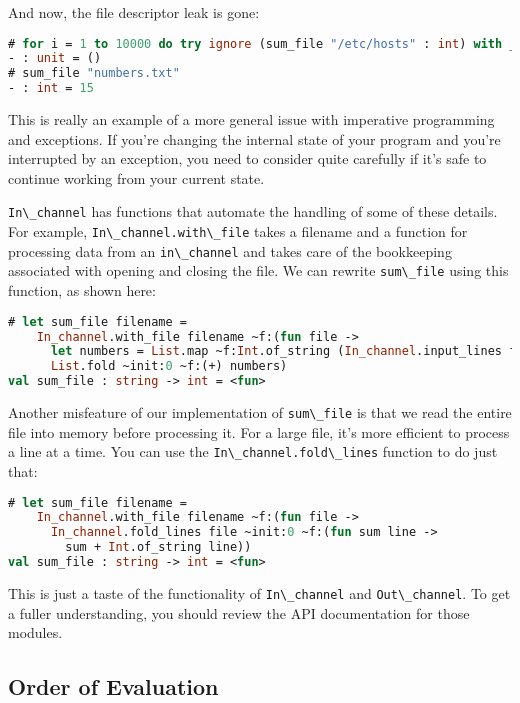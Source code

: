 And now, the file descriptor leak is gone:

\begin{lstlisting}[language=Caml]
# for i = 1 to 10000 do try ignore (sum_file "/etc/hosts" : int) with _ -> () done
- : unit = ()
# sum_file "numbers.txt"
- : int = 15
\end{lstlisting}

This is really an example of a more general issue with imperative
programming and exceptions. If you're changing the internal state of
your program and you're interrupted by an exception, you need to
consider quite carefully if it's safe to continue working from your
current state.

\passthrough{\lstinline!In\_channel!} has functions that automate the
handling of some of these details. For example,
\passthrough{\lstinline!In\_channel.with\_file!} takes a filename and a
function for processing data from an
\passthrough{\lstinline!in\_channel!} and takes care of the bookkeeping
associated with opening and closing the file. We can rewrite
\passthrough{\lstinline!sum\_file!} using this function, as shown here:

\begin{lstlisting}[language=Caml]
# let sum_file filename =
    In_channel.with_file filename ~f:(fun file ->
      let numbers = List.map ~f:Int.of_string (In_channel.input_lines file) in
      List.fold ~init:0 ~f:(+) numbers)
val sum_file : string -> int = <fun>
\end{lstlisting}

Another misfeature of our implementation of
\passthrough{\lstinline!sum\_file!} is that we read the entire file into
memory before processing it. For a large file, it's more efficient to
process a line at a time. You can use the
\passthrough{\lstinline!In\_channel.fold\_lines!} function to do just
that:

\begin{lstlisting}[language=Caml]
# let sum_file filename =
    In_channel.with_file filename ~f:(fun file ->
      In_channel.fold_lines file ~init:0 ~f:(fun sum line ->
        sum + Int.of_string line))
val sum_file : string -> int = <fun>
\end{lstlisting}

This is just a taste of the functionality of
\passthrough{\lstinline!In\_channel!} and
\passthrough{\lstinline!Out\_channel!}. To get a fuller understanding,
you should review the API documentation for those modules.~

\hypertarget{order-of-evaluation}{%
\subsection{Order of Evaluation}\label{order-of-evaluation}}

